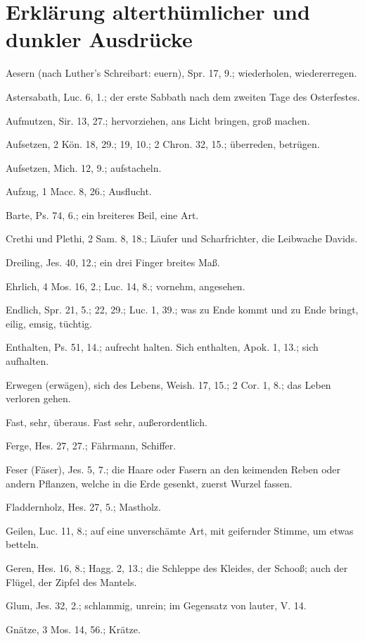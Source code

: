 \chapter{Erklärung alterthümlicher und dunkler Ausdrücke}


Aesern (nach Luther's Schreibart: euern), Spr. 17, 9.; wiederholen, wiedererregen.

Astersabath, Luc. 6, 1.; der erste Sabbath nach dem zweiten Tage des Osterfestes.

Aufmutzen, Sir. 13, 27.; hervorziehen, ans Licht bringen, groß machen.

Aufsetzen, 2 Kön. 18, 29.; 19, 10.; 2 Chron. 32, 15.; überreden, betrügen.

Aufsetzen, Mich. 12, 9.; aufstacheln.

Aufzug, 1 Macc. 8, 26.; Ausflucht.

Barte, Ps. 74, 6.; ein breiteres Beil, eine Art.

Crethi und Plethi, 2 Sam. 8, 18.; Läufer und Scharfrichter, die Leibwache Davids.

Dreiling, Jes. 40, 12.; ein drei Finger breites Maß.

Ehrlich, 4 Mos. 16, 2.; Luc. 14, 8.; vornehm, angesehen.

Endlich, Spr. 21, 5.; 22, 29.; Luc. 1, 39.; was zu Ende kommt und zu Ende bringt, eilig, emsig, tüchtig.

Enthalten, Ps. 51, 14.; aufrecht halten. Sich enthalten, Apok. 1, 13.; sich aufhalten.

Erwegen (erwägen), sich des Lebens, Weish. 17, 15.; 2 Cor. 1, 8.; das Leben verloren gehen.

Fast, sehr, überaus. Fast sehr, außerordentlich.

Ferge, Hes. 27, 27.; Fährmann, Schiffer.

Feser (Fäser), Jes. 5, 7.; die Haare oder Fasern an den keimenden Reben oder andern Pflanzen, welche in die Erde gesenkt, zuerst Wurzel fassen.

Fladdernholz, Hes. 27, 5.; Mastholz.

Geilen, Luc. 11, 8.; auf eine unverschämte Art, mit geifernder Stimme, um etwas betteln.

Geren, Hes. 16, 8.; Hagg. 2, 13.; die Schleppe des Kleides, der Schooß; auch der Flügel, der Zipfel des Mantels.

Glum, Jes. 32, 2.; schlammig, unrein; im Gegensatz von lauter, V. 14.

Gnätze, 3 Mos. 14, 56.; Krätze.

